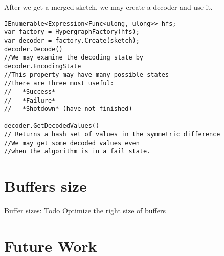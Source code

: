 After we get a merged sketch, we may create a decoder and use it.
\begin{lstlisting}
IEnumerable<Expression<Func<ulong, ulong>> hfs;
var factory = HypergraphFactory(hfs);
var decoder = factory.Create(sketch);
decoder.Decode()
//We may examine the decoding state by
decoder.EncodingState
//This property may have many possible states
//there are three most useful:
// - *Success*
// - *Failure*
// - *Shotdown* (have not finished) 

decoder.GetDecodedValues() 
// Returns a hash set of values in the symmetric difference
//We may get some decoded values even
//when the algorithm is in a fail state.
\end{lstlisting}

\section{Buffers size}
Buffer sizes: Todo
Optimize the right size of buffers


\section{Future Work} 
    
